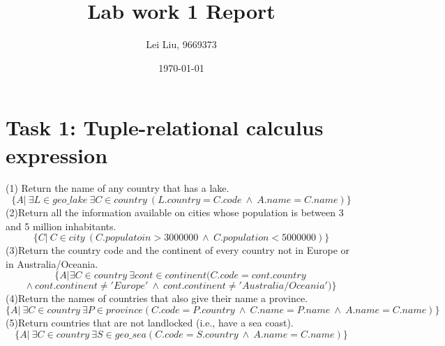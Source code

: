 \documentclass[10pt]{article}
\begin{document}
\title{Lab work 1 Report}
\author{Lei Liu, 9669373}
\date{\today}
\maketitle

\section{Task 1: Tuple-relational calculus expression}
(1) Return the name of any country that has a lake.\\
$$\{A | \ \exists L \in geo\_lake \ \exists C \in country \ ( L.country = C.code \ \wedge\ A.name=C.name) \}$$
(2)Return all the information available on cities whose population is between 3 and 5 million inhabitants.
$$\{C | \  C \in city \ ( C.populatoin>3000000 \ \wedge\ C.population<5000000) \}$$
(3)Return the country code and the continent of every country not in Europe or in Australia/Oceania.
$$\{A | \exists  C \in country \  \exists cont \in continent ( C.code=cont.country \ $$$$\wedge\  cont.continent \neq 'Europe' \ \wedge\ cont.continent \neq 'Australia/Oceania' ) \}$$
(4)Return the names of countries that also give their name a province.
$$\{A | \ \exists C \in country \ \exists P \in province ( C.code=P.country \ \wedge\ C.name=P.name \ \wedge\ A.name=C.name) \}$$
(5)Return countries that are not landlocked (i.e., have a sea coast).
$$\{A | \ \exists C \in country \ \exists S \in geo\_sea ( C.code=S.country \ \wedge\ A.name=C.name) \}$$
\end{document}
